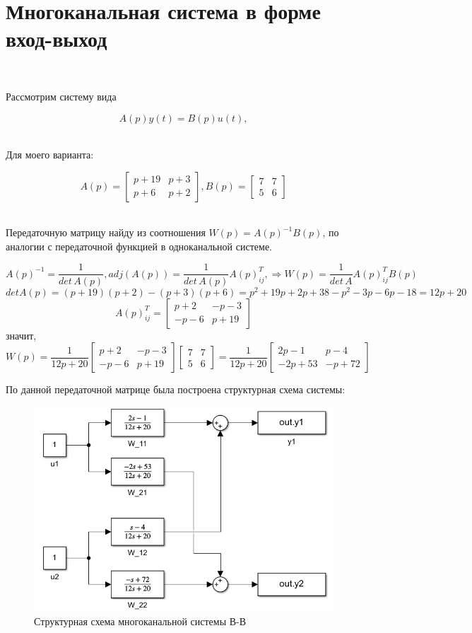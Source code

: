 \documentclass[a4paper]{article}
\begin{document}
\section{Многоканальная система в форме вход-выход}\

Рассмотрим систему вида\ 

$$
A(p)y(t) = B(p)u(t),
$$\ 

Для моего варианта:

$$
A(p) = \begin{bmatrix}
    p + 19 & p+3 \\ 
    p + 6 & p + 2
\end{bmatrix}, B(p) = \begin{bmatrix}
    7 & 7 \\
    5 & 6
\end{bmatrix}
$$\ 

Передаточную матрицу найду из соотношения $W(p) = A(p)^{-1}B(p)$, по аналогии с передаточной функцией в одноканальной системе.

$$
A(p)^{-1} = \frac{1}{det\,A(p)},adj(A(p)) =\frac{1}{det\,A(p)}A(p)_{ij}^T, \Rightarrow W(p) = \frac{1}{det\,A}A(p)_{ij}^T B(p)
$$
$$
detA(p) = (p+19)(p+2) - (p+3)(p+6) = p^2+19p+2p+38-p^2-3p-6p-18 = 12p+20
$$
$$
A(p)_{ij}^T=\begin{bmatrix}
    p+2 & -p-3 \\
    -p-6 & p+19
\end{bmatrix}
$$
значит,
$$
W(p) = \frac{1}{12p+20}\begin{bmatrix}
    p+2 & -p-3 \\
    -p-6 & p+19
\end{bmatrix}\begin{bmatrix}
    7 & 7 \\ 
    5 & 6
\end{bmatrix}= \frac{1}{12p+20}\begin{bmatrix}
    2p-1 & p-4 \\
    -2p+53 & -p+72
\end{bmatrix}
$$

По данной передаточной матрице была построена структурная схема системы:

\begin{figure}[H]
    \centering
    \includegraphics[width=0.65\linewidth]{ex3/scheme.png}
    \caption{Структурная схема многоканальной системы В-В}
\end{figure}
\end{document}
